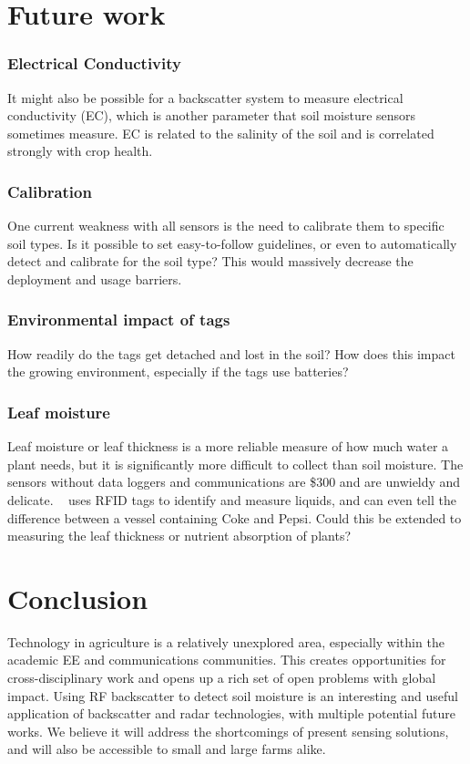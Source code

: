 \documentclass[12pt]{article}
\begin{document}
\section*{Future work}
\subsubsection*{Electrical Conductivity} It might also be possible for a
backscatter system to measure electrical conductivity (EC), which is
another parameter that soil moisture sensors sometimes measure. EC is
related to the salinity of the soil and is correlated strongly with
crop health.

\subsubsection*{Calibration} One current weakness with all sensors is the
need to calibrate them to specific soil types. Is it possible to set
easy-to-follow guidelines, or even to automatically detect and
calibrate for the soil type? This would massively decrease the
deployment and usage barriers.

\subsubsection*{Environmental impact of tags}
How readily do the tags get detached and lost in the soil? How does
this impact the growing environment, especially if the tags use
batteries?

\subsubsection*{Leaf moisture}
Leaf moisture or leaf thickness is a more reliable measure of how much
water a plant needs, but it is significantly more difficult to collect
than soil moisture. The sensors without data loggers and
communications are \$300 and are unwieldy and
delicate. ~\cite{Wang2017} uses RFID tags to identify and measure
liquids, and can even tell the difference between a vessel containing
Coke and Pepsi. Could this be extended to measuring the leaf thickness
or nutrient absorption of plants?


\section*{Conclusion}
Technology in agriculture is a relatively unexplored area, especially
within the academic EE and communications communities. This creates
opportunities for cross-disciplinary work and opens up a rich set of
open problems with global impact. Using RF backscatter to detect
soil moisture is an interesting and useful application of backscatter
and radar technologies, with multiple potential future works. We
believe it will address the shortcomings of present sensing solutions,
and will also be accessible to small and large farms alike.
\end{document}
